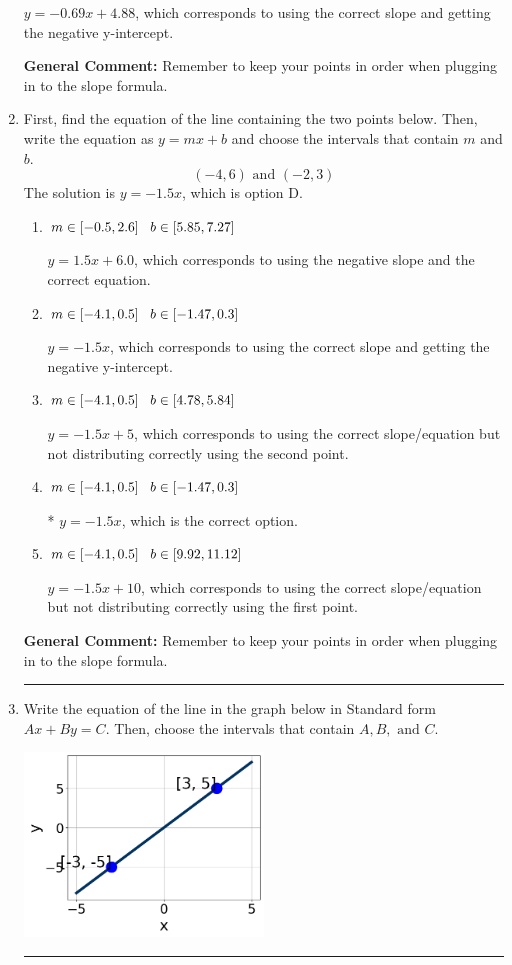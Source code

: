 \documentclass{extbook}[14pt]
\newcommand{\litem}[1]{\item #1

\rule{\textwidth}{0.4pt}}
\begin{document}
\begin{enumerate}
{\begin{enumerate}[label=\Alph*.]
 $y = -0.69x + 4.88$, which corresponds to using the correct slope and getting the negative y-intercept.
\end{enumerate}

\textbf{General Comment:} Remember to keep your points in order when plugging in to the slope formula.
}
\litem{
First, find the equation of the line containing the two points below. Then, write the equation as $ y=mx+b $ and choose the intervals that contain $m$ and $b$.
\[ (-4, 6) \text{ and } (-2, 3) \]The solution is \( y = -1.5x \), which is option D.\begin{enumerate}[label=\Alph*.]
\item \( m \in [-0.5, 2.6] \hspace*{3mm} b \in [5.85, 7.27] \)

 $y = 1.5x + 6.0$, which corresponds to using the negative slope and the correct equation.
\item \( m \in [-4.1, 0.5] \hspace*{3mm} b \in [-1.47, 0.3] \)

 $y = -1.5x$, which corresponds to using the correct slope and getting the negative y-intercept.
\item \( m \in [-4.1, 0.5] \hspace*{3mm} b \in [4.78, 5.84] \)

 $y = -1.5x + 5$, which corresponds to using the correct slope/equation but not distributing correctly using the second point.
\item \( m \in [-4.1, 0.5] \hspace*{3mm} b \in [-1.47, 0.3] \)

* $y = -1.5x$, which is the correct option.
\item \( m \in [-4.1, 0.5] \hspace*{3mm} b \in [9.92, 11.12] \)

 $y = -1.5x + 10$, which corresponds to using the correct slope/equation but not distributing correctly using the first point.
\end{enumerate}

\textbf{General Comment:} Remember to keep your points in order when plugging in to the slope formula.
}
\litem{
Write the equation of the line in the graph below in Standard form $Ax+By=C$. Then, choose the intervals that contain $A, B, \text{ and } C$.

\begin{center}
    \includegraphics[width=0.5\textwidth]{../Figures/linearGraphToStandardCopyC.png}
\end{center}


}
\end{enumerate}
\end{document}
